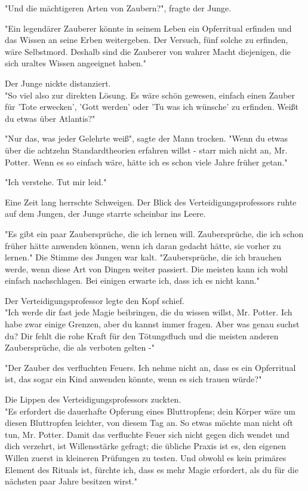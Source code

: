 {"Und die mächtigeren Arten von Zaubern?", fragte der Junge.

"Ein legendärer Zauberer könnte in seinem Leben ein Opferritual erfinden und das Wissen an seine Erben weitergeben. Der Versuch, fünf solche zu erfinden, wäre Selbstmord. Deshalb sind die Zauberer von wahrer Macht diejenigen, die sich uraltes Wissen angeeignet haben."

Der Junge nickte distanziert.\\ "So viel also zur direkten Lösung. Es wäre schön gewesen, einfach einen Zauber für 'Tote erwecken', 'Gott werden' oder 'Tu was ich wünsche' zu erfinden. Weißt du etwas über Atlantis?"

"Nur das, was jeder Gelehrte weiß", sagte der Mann trocken. "Wenn du etwas über die achtzehn Standardtheorien erfahren willst - starr mich nicht an, Mr. Potter. Wenn es so einfach wäre, hätte ich es schon viele Jahre früher getan."

"Ich verstehe. Tut mir leid."

Eine Zeit lang herrschte Schweigen. Der Blick des Verteidigungsprofessors ruhte auf dem Jungen, der Junge starrte scheinbar ins Leere.

"Es gibt ein paar Zaubersprüche, die ich lernen will. Zaubersprüche, die ich schon früher hätte anwenden können, wenn ich daran gedacht hätte, sie vorher zu lernen." Die Stimme des Jungen war kalt. "Zaubersprüche, die ich brauchen werde, wenn diese Art von Dingen weiter passiert. Die meisten kann ich wohl einfach nachschlagen. Bei einigen erwarte ich, dass ich es nicht kann."

Der Verteidigungsprofessor legte den Kopf schief.\\ "Ich werde dir fast jede Magie beibringen, die du wissen willst, Mr. Potter. Ich habe zwar einige Grenzen, aber du kannst immer fragen. Aber was genau suchst du? Dir fehlt die rohe Kraft für den Tötungsfluch und die meisten anderen Zaubersprüche, die als verboten gelten -"

"Der Zauber des verfluchten Feuers. Ich nehme nicht an, dass es ein Opferritual ist, das sogar ein Kind anwenden könnte, wenn es sich trauen würde?"

Die Lippen des Verteidigungsprofessors zuckten.\\ "Es erfordert die dauerhafte Opferung eines Bluttropfens; dein Körper wäre um diesen Bluttropfen leichter, von diesem Tag an. So etwas möchte man nicht oft tun, Mr. Potter. Damit das verfluchte Feuer sich nicht gegen dich wendet und dich verzehrt, ist Willensstärke gefragt; die übliche Praxis ist es, den eigenen Willen zuerst in kleineren Prüfungen zu testen. Und obwohl es kein primäres Element des Rituals ist, fürchte ich, dass es mehr Magie erfordert, als du für die nächsten paar Jahre besitzen wirst."

}
